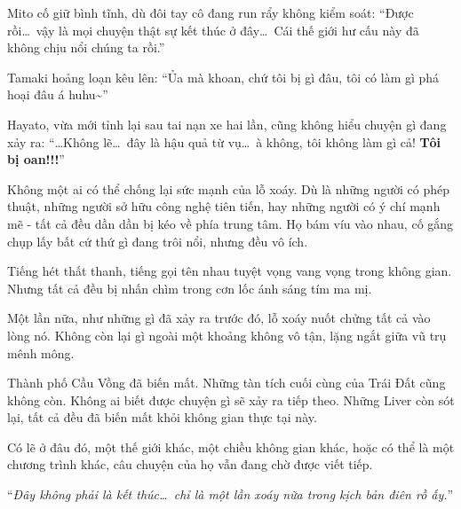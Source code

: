 \documentclass[../main.tex]{subfiles}
\begin{document}
Mito cố giữ bình tĩnh, dù đôi tay cô đang run rẩy không kiểm soát: ``Được rồi\dots\ vậy là mọi chuyện thật sự kết thúc ở đây\dots\ Cái thế giới hư cấu này đã không chịu nổi chúng ta rồi.''

Tamaki hoảng loạn kêu lên: ``Ủa mà khoan, chứ tôi bị gì đâu, tôi có làm gì phá hoại đâu á huhu\~{}''

Hayato, vừa mới tỉnh lại sau tai nạn xe hai lần, cũng không hiểu chuyện gì đang xảy ra: ``\dots Không lẽ\dots\ đây là hậu quả từ vụ\dots\ à không, tôi không làm gì cả! \textbf{Tôi bị oan!!!}''

Không một ai có thể chống lại sức mạnh của lỗ xoáy. Dù là những người có phép thuật, những người sở hữu công nghệ tiên tiến, hay những người có ý chí mạnh mẽ - tất cả đều dần dần bị kéo về phía trung tâm. Họ bám víu vào nhau, cố gắng chụp lấy bất cứ thứ gì đang trôi nổi, nhưng đều vô ích.

Tiếng hét thất thanh, tiếng gọi tên nhau tuyệt vọng vang vọng trong không gian. Nhưng tất cả đều bị nhấn chìm trong cơn lốc ánh sáng tím ma mị.

Một lần nữa, như những gì đã xảy ra trước đó, lỗ xoáy nuốt chửng tất cả vào lòng nó. Không còn lại gì ngoài một khoảng không vô tận, lặng ngắt giữa vũ trụ mênh mông.

Thành phố Cầu Vồng đã biến mất. Những tàn tích cuối cùng của Trái Đất cũng không còn. Không ai biết được chuyện gì sẽ xảy ra tiếp theo. Những Liver còn sót lại, tất cả đều đã biến mất khỏi không gian thực tại này.

Có lẽ ở đâu đó, một thế giới khác, một chiều không gian khác, hoặc có thể là một chương trình khác, câu chuyện của họ vẫn đang chờ được viết tiếp.

\begin{center}
  ``\emph{Đây không phải là kết thúc\dots\ chỉ là một lần xoáy nữa trong kịch bản điên rồ ấy.}''
\end{center}
\end{document}
